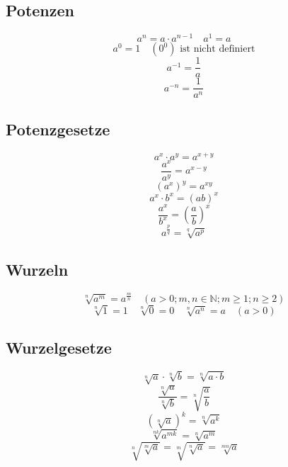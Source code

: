 \subsection{Potenzen}
\[ \boxed{a^n = a \cdot a^{n-1} \quad a^1 = a} \]
\[ \boxed{a^0 = 1 \quad \left(0^0\right)\text{ ist nicht definiert}} \]
\[ \boxed{a^{-1} = \frac{1}{a}} \]
\[ \boxed{a^{-n} = \frac{1}{a^n}} \]

\subsection{Potenzgesetze}
\[ \boxed{a^x \cdot a^y = a^{x+y}} \]
\[ \boxed{\frac{a^x}{a^y} = a^{x-y}} \]
\[ \boxed{(a^x)^y = a^{xy}} \]
\[ \boxed{a^x \cdot b^x = \left(ab\right)^x} \]
\[ \boxed{\frac{a^x}{b^x} = \left(\frac{a}{b}\right)^x} \]
\[ \boxed{a^{\frac{p}{q}} = \sqrt[q]{a^p}} \]

\subsection{Wurzeln}
\[ \boxed{\sqrt[n]{a^m} = a^{\frac{m}{n}} \quad \left(a>0; m, n \in \mathbb{N}; m \geq 1; n \geq 2\right)} \]
\[ \boxed{\sqrt[n]{1}=1 \quad \sqrt[n]{0}=0 \quad \sqrt[n]{a^n}=a \quad \left(a>0\right)} \]

\subsection{Wurzelgesetze}
\[ \boxed{\sqrt[n]{a}\cdot \sqrt[n]{b}=\sqrt[n]{a\cdot b}} \]
\[ \boxed{\frac{\sqrt[n]{a}}{\sqrt[n]{b}}=\sqrt[n]{\frac{a}{b}}} \]
\[ \boxed{\left(\sqrt[n]{a}\right)^k=\sqrt[n]{a^k}} \]
\[ \boxed{\sqrt[nk]{a^{mk}}=\sqrt[n]{a^m}} \]
\[ \boxed{\sqrt[n]{\sqrt[m]{a}}=\sqrt[m]{\sqrt[n]{a}}=\sqrt[mn]{a}} \]

